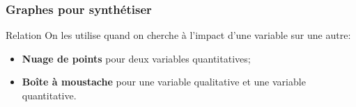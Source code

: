 \documentclass[10pt]{beamer}
\begin{document}
\begin{frame}
\frametitle {Graphes pour synthétiser}
\begin{block}{Relation}
On les utilise quand on cherche à l'impact d'une variable sur une autre:
\begin{itemize}
\item \textbf{Nuage de points} pour deux variables quantitatives;\\
\item \textbf{Boîte à moustache} pour une variable qualitative et une variable quantitative.
\end{itemize}
\end{block}

\end{frame}
\end{document}
